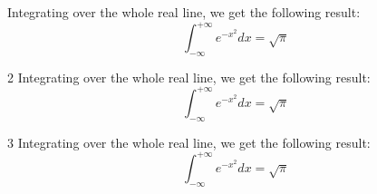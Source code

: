 \begin{info}
    Integrating over the whole real line, we get the following result:
    \begin{equation}
        \int_{-\infty}^{+\infty} e^{-x^2} dx = \sqrt{\pi}
    \end{equation}
\end{info}

\begin{info}
    2 Integrating over the whole real line, we get the following result:
    \begin{equation}
        \int_{-\infty}^{+\infty} e^{-x^2} dx = \sqrt{\pi}
    \end{equation}
\end{info}

\begin{info}
    3 Integrating over the whole real line, we get the following result:
    \begin{equation}
        \int_{-\infty}^{+\infty} e^{-x^2} dx = \sqrt{\pi}
    \end{equation}
\end{info}

